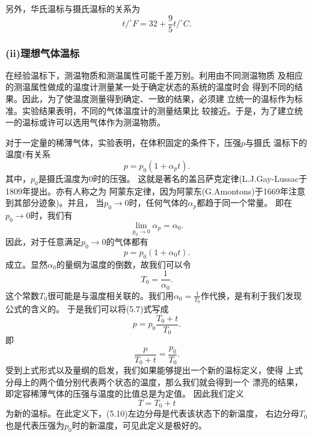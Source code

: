 另外，华氏温标与摄氏温标的关系为
\begin{equation}
    t/^{\circ}F=32+\frac{9}{5}t/^{\circ}C.
\end{equation}

\subsubsection{(ii)理想气体温标}

在经验温标下，测温物质和测温属性可能千差万别。利用由不同测温物质
及相应的测温属性做成的温度计测量某一处于确定状态的系统的温度时会
得到不同的结果。因此，为了使温度测量得到确定、一致的结果，必须建
立统一的温标作为标准。实验结果表明，不同的气体温度计的测量结果比
较接近。于是，为了建立统一的温标或许可以选用气体作为测温物质。

对于一定量的稀薄气体，实验表明，在体积固定的条件下，压强$p$与摄氏
温标下的温度$t$有关系
\begin{equation}
    p=p_0(1+\alpha_pt).
\end{equation}
其中，$p_0$是摄氏温度为0时的压强。
这就是著名的盖吕萨克定律(L.J.Gay-Lussac于1809年提出。亦有人称之为
阿蒙东定律，因为阿蒙东(G.Amontons)于1669年注意到其部分迹象)。并且，
当$p_0\rightarrow 0$时，任何气体的$\alpha_p$都趋于同一个常量。
即在$p_0\rightarrow 0$时，我们有
\begin{equation}
    \lim \limits_{p_0\rightarrow 0}\alpha_p=\alpha_0.
\end{equation}
因此，对于任意满足$p_0\rightarrow 0$的气体都有
\begin{equation}
    p=p_0(1+\alpha_0t).
\end{equation}
成立。显然$\alpha_0$的量纲为温度的倒数，故我们可以令
\begin{equation}
    T_0=\frac{1}{\alpha_0}.
\end{equation}
这个常数$T_0$很可能是与温度相关联的。我们用$\alpha_0=
\frac{1}{T_0}$作代换，是有利于我们发现公式的含义的。
于是我们可以将(5.7)式写成
\begin{equation}
    p=p_0\frac{T_0+t}{T_0}.
\end{equation}
即 
\begin{equation}
    \frac{p}{T_0+t}=\frac{p_0}{T_0}.
\end{equation}
受到上式形式以及量纲的启发，我们如果能够提出一个新的温标定义，使得
上式分母上的两个值分别代表两个状态的温度，那么我们就会得到一个
漂亮的结果，即定容稀薄气体的压强与温度的比值总是为定值。
因此我们定义
\begin{equation}
    T=T_0+t
\end{equation}
为新的温标。在此定义下，(5.10)左边分母是代表该状态下的新温度，
右边分母$T_0$也是代表压强为$p_0$时的新温度，可见此定义是极好的。

